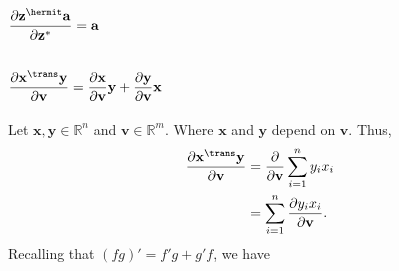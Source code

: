 \subsection{\(\dfrac{\partial \mathbf{z}^\hermit \mathbf{a}}{\partial \mathbf{z}^*} = \mathbf{a}\)}
 \cite{hjorungnes2011complex}

\subsection{\(\dfrac{\partial \mathbf{x}^\trans \mathbf{y}}{\partial \mathbf{v}} = \dfrac{\partial \mathbf{x}}{\partial \mathbf{v}}\mathbf{y} + \dfrac{\partial \mathbf{y}}{\partial \mathbf{v}}\mathbf{x}\)}
Let \(\mathbf{x},\mathbf{y} \in \mathbb{R}^{n}\) and \(\mathbf{v} \in \mathbb{R}^{m}\). Where \(\mathbf{x}\) and \(\mathbf{y}\) depend on \(\mathbf{v}\). Thus,
\begin{align}
    \dfrac{\partial \mathbf{x}^\trans \mathbf{y}}{\partial \mathbf{v}} & = \dfrac{\partial}{\partial \mathbf{v}}\sum_{i=1}^{n} y_ix_i \\
    & = \sum_{i=1}^{n} \dfrac{\partial y_ix_i}{\partial \mathbf{v}}.
\end{align}
Recalling that \((fg)' = f'g + g'f\), we have
